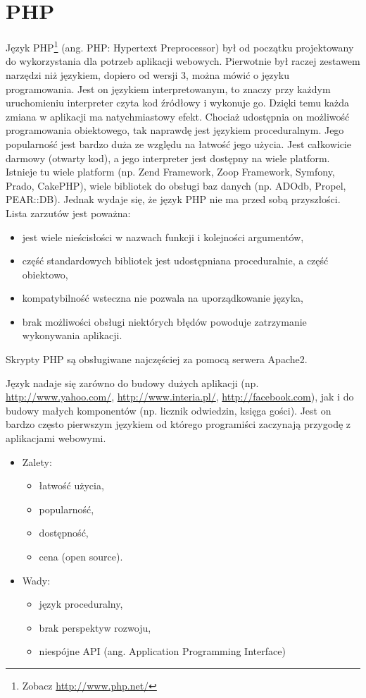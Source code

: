 \documentclass[a4paper,12pt,oneside]{report}
\begin{document}
\section{PHP}
\label{sec:php}
Język PHP\footnote{Zobacz \url{http://www.php.net/}} (ang. PHP: Hypertext Preprocessor) był od początku projektowany do wykorzystania dla potrzeb aplikacji webowych. Pierwotnie był raczej zestawem narzędzi niż językiem, dopiero od wersji 3, można mówić o języku programowania. Jest on językiem interpretowanym, to znaczy przy każdym uruchomieniu interpreter czyta kod źródłowy i wykonuje go. Dzięki temu każda zmiana w aplikacji ma natychmiastowy efekt. Chociaż udostępnia on możliwość programowania obiektowego, tak naprawdę jest językiem proceduralnym. Jego popularność jest bardzo duża ze względu na łatwość jego użycia. Jest całkowicie darmowy (otwarty kod), a jego interpreter jest dostępny na wiele platform. Istnieje tu wiele platform (np. Zend Framework, Zoop Framework, Symfony, Prado, CakePHP), wiele bibliotek do obsługi baz danych (np. ADOdb, Propel, PEAR::DB). Jednak wydaje się, że język PHP nie ma przed sobą przyszłości. Lista zarzutów jest poważna:
\begin{itemize}
  \item jest wiele nieścisłości w nazwach funkcji i kolejności argumentów,
  \item część standardowych bibliotek jest udostępniana proceduralnie, a część obiektowo,
  \item kompatybilność wsteczna nie pozwala na uporządkowanie języka,
  \item brak możliwości obsługi niektórych błędów powoduje zatrzymanie wykonywania aplikacji.
\end{itemize}
Skrypty PHP są obsługiwane najczęściej za pomocą serwera Apache2.

Język nadaje się zarówno do budowy dużych aplikacji (np. \url{http://www.yahoo.com/}, \url{http://www.interia.pl/}, \url{http://facebook.com}), jak i do budowy małych komponentów (np. licznik odwiedzin, księga gości). Jest on bardzo często pierwszym językiem od którego programiści zaczynają przygodę z aplikacjami webowymi.
\begin{itemize}
\item Zalety:
  \begin{itemize}
  \item łatwość użycia, 
  \item popularność,
  \item dostępność,
  \item cena (open source).
  \end{itemize}
\item Wady:
  \begin{itemize}
  \item język proceduralny,
  \item brak perspektyw rozwoju,
  \item niespójne API (ang. Application Programming Interface)
  \end{itemize}
\end{itemize}
\end{document}
